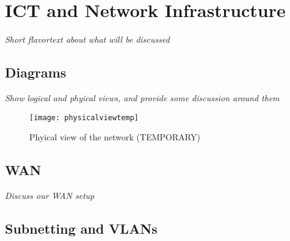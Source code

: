 \clearpage

\section{ICT and Network Infrastructure}

%

\textit{Short flavortext about what will be discussed}


\subsection{Diagrams}

\textit{Show logical and phyical views, and provide some discussion around them}


\begin{figure}[H]
\caption{Phyical view of the network (TEMPORARY)}
\centering
\texttt{[image: physicalviewtemp]}
\label{physicalview}
\end{figure}

\subsection{WAN}

\textit{Discuss our WAN setup}

\subsection{Subnetting and VLANs}


